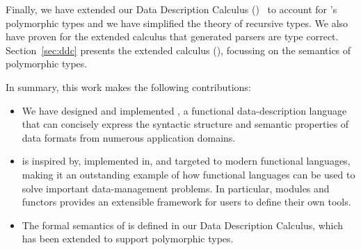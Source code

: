 Finally, we have extended our Data Description Calculus
(\ddcold{})~\cite{fisher+:next700ddl} to account for \padsml{}'s
polymorphic types and we have simplified the theory of recursive
types.  We also have proven for the extended calculus that generated
parsers are type correct.  Section~\ref{sec:ddc} presents the extended
calculus (\ddc{}), focussing on the semantics of polymorphic types.



In summary, this work makes the following contributions:
\begin{itemize}
\item We have designed and implemented \padsml{}, a functional
data-description language that can concisely express the syntactic
structure and semantic properties of data formats from numerous
application domains.
\item \padsml{} is inspired by, implemented in, and targeted to modern
functional languages, making it an outstanding example of how
functional languages can be used to solve
important data-management problems.  In particular, \ml{} modules and
functors provides an extensible framework for \padsml{} users to define their
own \padsml{} tools. 
\item The formal semantics of \padsml{} is defined in our Data Description
Calculus, which has been extended to support polymorphic types.
\end{itemize}

